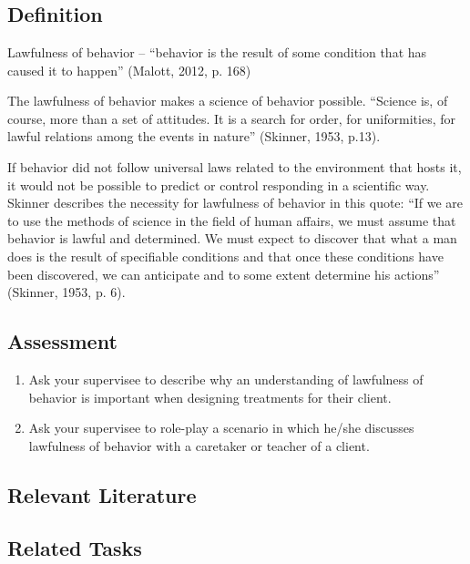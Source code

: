 \clearpage \section{\fourFKOne{}}
\subsection{Definition}
Lawfulness of behavior – ``behavior is the result of some condition that has caused it to happen'' (Malott, 2012, p. 168)

The lawfulness of behavior makes a science of behavior possible. ``Science is, of course, more than a set of attitudes. It is a search for order, for uniformities, for lawful relations among the events in nature'' (Skinner, 1953, p.13).

If behavior did not follow universal laws related to the environment that hosts it, it would not be possible to predict or control responding in a scientific way. Skinner describes the necessity for lawfulness of behavior in this quote: ``If we are to use the methods of science in the field of human affairs, we must assume that behavior is lawful and determined. We must expect to discover that what a man does is the result of specifiable conditions and that once these conditions have been discovered, we can anticipate and to some extent determine his actions'' (Skinner, 1953, p. 6).
%
%
%
\subsection{Assessment}
\begin{enumerate}
\item Ask your supervisee to describe why an understanding of lawfulness of behavior is important when designing treatments for their client.
\item Ask your supervisee to role-play a scenario in which he/she discusses lawfulness of behavior with a caretaker or teacher of a client.
%
\end{enumerate}
%
\subsection{Relevant Literature}
\begin{refsection}
\nocite{malott2015principles,
        skinner1953science}
\printbibliography[heading=none]
\end{refsection}
%
\subsection{Related Tasks}
\fourbThree{}\\
\fourFKTwo{}\\
\fourFKThree{}\\
\fourFKFour{}\\
\fourFKFive{}\\
\fourFKSix{}\\
